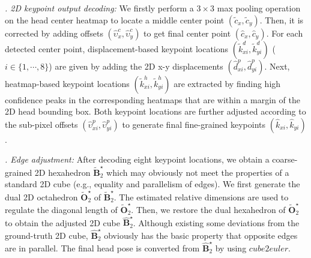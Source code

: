 \documentclass{article}
\begin{document}
{\it {}. 2D keypoint output decoding:}
We firstly perform a $3 \times 3$ max pooling operation on the head center heatmap to locate a middle center point $(\tilde{c}_x, \tilde{c}_y)$. Then, it is corrected by adding offsets $(\hat{\upsilon}^c_x, \hat{\upsilon}^c_y)$ to get final center point $(\hat{c}_x, \hat{c}_y)$. For each detected center point, displacement-based keypoint locations $(\tilde{k}^d_{xi}, \tilde{k}^d_{yi})$ ($i \in \{1,\cdots,8\}$) are given by adding the 2D x-y displacements $(\hat{d}^p_{xi}, \hat{d}^p_{yi})$. Next, heatmap-based keypoint locations $(\tilde{k}^h_{xi}, \tilde{k}^h_{yi})$ are extracted by finding high confidence peaks in the corresponding heatmaps that are within a margin of the 2D head bounding box. Both keypoint locations are further adjusted according to the sub-pixel offsets $(\hat{\upsilon}^p_{xi}, \hat{\upsilon}^p_{yi})$ to generate final fine-grained keypoints $(\hat{k}_{xi}, \hat{k}_{yi})$.

{\it {}. Edge adjustment:}
After decoding eight keypoint locations, we obtain a coarse-grained 2D hexahedron $\widetilde{\mathbf{B}}^\star_2$ which may obviously not meet the properties of a standard 2D cube (e.g., equality and parallelism of edges). We first generate the dual 2D octahedron $\widetilde{\mathbf{O}}^\star_2$ of $\widetilde{\mathbf{B}}^\star_2$. The estimated relative dimensions are used to regulate the diagonal length of $\widetilde{\mathbf{O}}^\star_2$. Then, we restore the dual hexahedron of $\widetilde{\mathbf{O}}^\star_2$ to obtain the adjusted 2D cube $\widehat{\mathbf{B}}^\star_2$. Although existing some deviations from the ground-truth 2D cube, $\widehat{\mathbf{B}}^\star_2$ obviously has the basic property that opposite edges are in parallel. The final head pose is converted from $\widehat{\mathbf{B}}^\star_2$ by using $cube2euler$.
\end{document}
